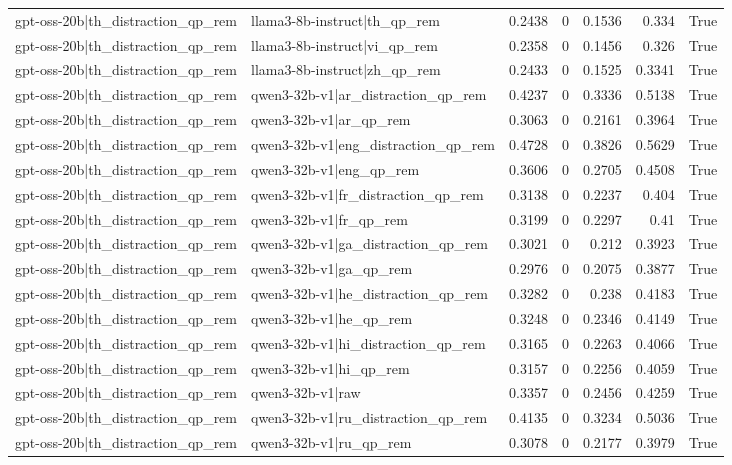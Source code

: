 \begin{table}
\begin{tabular}{l l r r r r l}
gpt-oss-20b|th_distraction_qp_rem & llama3-8b-instruct|th_qp_rem & 0.2438 & 0 & 0.1536 & 0.334 & True \\
gpt-oss-20b|th_distraction_qp_rem & llama3-8b-instruct|vi_qp_rem & 0.2358 & 0 & 0.1456 & 0.326 & True \\
gpt-oss-20b|th_distraction_qp_rem & llama3-8b-instruct|zh_qp_rem & 0.2433 & 0 & 0.1525 & 0.3341 & True \\
gpt-oss-20b|th_distraction_qp_rem & qwen3-32b-v1|ar_distraction_qp_rem & 0.4237 & 0 & 0.3336 & 0.5138 & True \\
gpt-oss-20b|th_distraction_qp_rem & qwen3-32b-v1|ar_qp_rem & 0.3063 & 0 & 0.2161 & 0.3964 & True \\
gpt-oss-20b|th_distraction_qp_rem & qwen3-32b-v1|eng_distraction_qp_rem & 0.4728 & 0 & 0.3826 & 0.5629 & True \\
gpt-oss-20b|th_distraction_qp_rem & qwen3-32b-v1|eng_qp_rem & 0.3606 & 0 & 0.2705 & 0.4508 & True \\
gpt-oss-20b|th_distraction_qp_rem & qwen3-32b-v1|fr_distraction_qp_rem & 0.3138 & 0 & 0.2237 & 0.404 & True \\
gpt-oss-20b|th_distraction_qp_rem & qwen3-32b-v1|fr_qp_rem & 0.3199 & 0 & 0.2297 & 0.41 & True \\
gpt-oss-20b|th_distraction_qp_rem & qwen3-32b-v1|ga_distraction_qp_rem & 0.3021 & 0 & 0.212 & 0.3923 & True \\
gpt-oss-20b|th_distraction_qp_rem & qwen3-32b-v1|ga_qp_rem & 0.2976 & 0 & 0.2075 & 0.3877 & True \\
gpt-oss-20b|th_distraction_qp_rem & qwen3-32b-v1|he_distraction_qp_rem & 0.3282 & 0 & 0.238 & 0.4183 & True \\
gpt-oss-20b|th_distraction_qp_rem & qwen3-32b-v1|he_qp_rem & 0.3248 & 0 & 0.2346 & 0.4149 & True \\
gpt-oss-20b|th_distraction_qp_rem & qwen3-32b-v1|hi_distraction_qp_rem & 0.3165 & 0 & 0.2263 & 0.4066 & True \\
gpt-oss-20b|th_distraction_qp_rem & qwen3-32b-v1|hi_qp_rem & 0.3157 & 0 & 0.2256 & 0.4059 & True \\
gpt-oss-20b|th_distraction_qp_rem & qwen3-32b-v1|raw & 0.3357 & 0 & 0.2456 & 0.4259 & True \\
gpt-oss-20b|th_distraction_qp_rem & qwen3-32b-v1|ru_distraction_qp_rem & 0.4135 & 0 & 0.3234 & 0.5036 & True \\
gpt-oss-20b|th_distraction_qp_rem & qwen3-32b-v1|ru_qp_rem & 0.3078 & 0 & 0.2177 & 0.3979 & True \\

\end{tabular}
\end{table}
